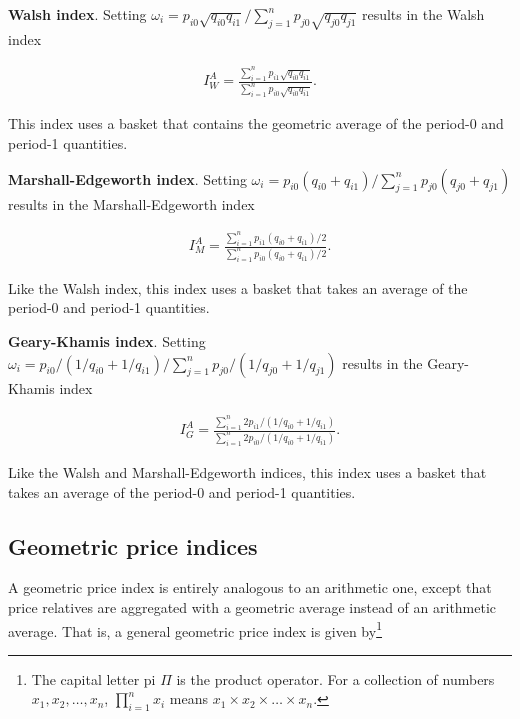 \documentclass[]{article}
\begin{document}
\textbf{Walsh index}. Setting \(\omega_{i} = p_{i0} \sqrt{q_{i0} q_{i1}} / \sum_{j = 1}^{n} p_{j0} \sqrt{q_{j0} q_{j1}}\) results in the Walsh index

\begin{align*}
I^{A}_{W} = \frac{\sum_{i = 1}^{n} p_{i1} \sqrt{q_{i0} q_{i1}}}{\sum_{i = 1}^{n} p_{i0} \sqrt{q_{i0} q_{i1}}}.
\end{align*}

This index uses a basket that contains the geometric average of the period-0 and period-1 quantities.

\textbf{Marshall-Edgeworth index}. Setting \(\omega_{i} = p_{i0} (q_{i0} + q_{i1}) / \sum_{j = 1}^{n} p_{j0} (q_{j0} + q_{j1})\) results in the Marshall-Edgeworth index

\begin{align*}
I^{A}_{M} = \frac{\sum_{i = 1}^{n} p_{i1} (q_{i0} + q_{i1}) / 2}{\sum_{i = 1}^{n} p_{i0} (q_{i0} + q_{i1}) / 2}.
\end{align*}

Like the Walsh index, this index uses a basket that takes an average of the period-0 and period-1 quantities.

\textbf{Geary-Khamis index}. Setting \(\omega_{i} = p_{i0} / (1 / q_{i0} + 1 / q_{i1}) / \sum_{j = 1}^{n} p_{j0} / (1 / q_{j0} + 1 / q_{j1})\) results in the Geary-Khamis index

\begin{align*}
I^{A}_{G} = \frac{\sum_{i = 1}^{n} 2 p_{i1} / (1 / q_{i0} + 1 / q_{i1})}{\sum_{i = 1}^{n} 2 p_{i0} / (1 / q_{i0} + 1 / q_{i1})}.
\end{align*}

Like the Walsh and Marshall-Edgeworth indices, this index uses a basket that takes an average of the period-0 and period-1 quantities.

\hypertarget{geometric-price-indices}{%
\subsection{Geometric price indices}\label{geometric-price-indices}}

A geometric price index is entirely analogous to an arithmetic one, except that price relatives are aggregated with a geometric average instead of an arithmetic average. That is, a general geometric price index is given by\footnote{The capital letter pi \(\Pi\) is the product operator. For a collection of numbers \(x_{1}, x_{2},\ldots,x_{n}\), \(\prod_{i=1}^{n} x_{i}\) means \(x_{1} \times x_{2} \times \ldots \times x_{n}\).}
\end{document}
